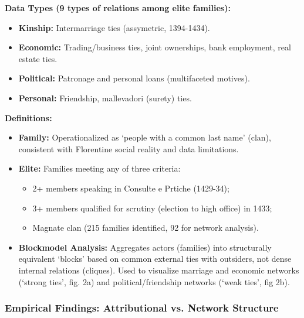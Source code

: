 \documentclass{article}
\begin{document}
    \noindent \textbf{Data Types (9 types of relations among elite families):}
    \begin{itemize}
        \item \textbf{Kinship:} Intermarriage ties (assymetric, 1394-1434).
        \item \textbf{Economic:} Trading/business ties, joint ownerships,
        bank employment, real estate ties.
        \item \textbf{Political:} Patronage and personal loans (multifaceted
        motives).
        \item \textbf{Personal:} Friendship, mallevadori (surety) ties.
    \end{itemize}

    \noindent \textbf{Definitions:}
    \begin{itemize}
        \item \textbf{Family:} Operationalized as `people with a common last
        name' (clan), consistent with Florentine social reality and data
        limitations.
        \item \textbf{Elite:} Families meeting any of three criteria:
        \begin{itemize}
            \item 2+ members speaking in Consulte e Prtiche (1429-34);
            \item 3+ members qualified for scrutiny (election to high
            office) in 1433;
            \item Magnate clan (215 families identified, 92 for network
            analysis).
        \end{itemize}
        \item \textbf{Blockmodel Analysis:} Aggregates actors (families)
        into structurally equivalent `blocks' based on common external ties
        with outsiders, not dense internal relations (cliques). Used to
        visualize marriage and economic networks (`strong ties', fig. 2a)
        and political/friendship networks (`weak ties', fig 2b).
    \end{itemize}

    \subsubsection{Empirical Findings: Attributional vs. Network Structure}
\end{document}
